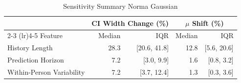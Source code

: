 \begin{table}[ht]
\centering
\footnotesize
\begin{tabular}{lrrrr}
\toprule
 & \multicolumn{2}{c}{CI Width Change (\%)} & \multicolumn{2}{c}{$\mu$ Shift (\%)} \\
\cmidrule(lr){2-3} \cmidrule(lr){4-5}
Feature & Median & IQR & Median & IQR \\
\midrule
History Length & 28.3 & [20.6, 41.8] & 12.8 & [5.6, 20.6] \\
Prediction Horizon & 7.2 & [3.0, 9.9] & 1.6 & [0.8, 3.2] \\
Within-Person Variability & 7.2 & [3.7, 12.4] & 1.3 & [0.3, 3.6] \\
\bottomrule
\end{tabular}
\caption{Sensitivity Summary Norma Gaussian}
\label{tab:sensitivity_summary_norma_gaussian}
\end{table}